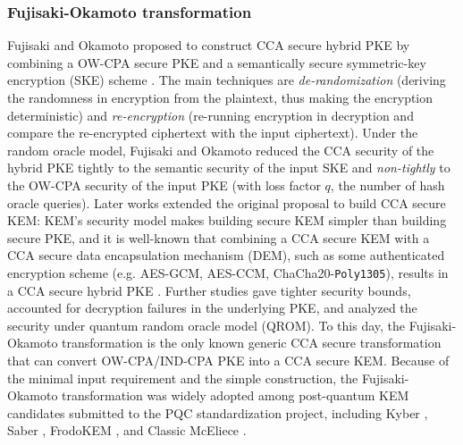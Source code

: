 \documentclass[runningheads]{llncs}
\begin{document}
\subsubsection{Fujisaki-Okamoto transformation}
Fujisaki and Okamoto proposed to construct CCA secure hybrid PKE by combining a OW-CPA secure PKE and a semantically secure symmetric-key encryption (SKE) scheme \cite{DBLP:conf/crypto/FujisakiO99}. The main techniques are \textit{de-randomization} (deriving the randomness in encryption from the plaintext, thus making the encryption deterministic) and \textit{re-encryption} (re-running encryption in decryption and compare the re-encrypted ciphertext with the input ciphertext). Under the random oracle model, Fujisaki and Okamoto reduced the CCA security of the hybrid PKE tightly to the semantic security of the input SKE and \textit{non-tightly} to the OW-CPA security of the input PKE (with loss factor $q$, the number of hash oracle queries). Later works extended the original proposal to build CCA secure KEM: KEM's security model makes building secure KEM simpler than building secure PKE, and it is well-known that combining a CCA secure KEM with a CCA secure data encapsulation mechanism (DEM), such as some authenticated encryption scheme (e.g. AES-GCM, AES-CCM, ChaCha20-\texttt{Poly1305}), results in a CCA secure hybrid PKE \cite{DBLP:journals/iacr/Shoup01,DBLP:conf/eurocrypt/Shoup00a}. Further studies \cite{DBLP:conf/ima/Dent03,DBLP:conf/tcc/HofheinzHK17,DBLP:journals/iacr/BernsteinP18,DBLP:conf/asiacrypt/HovelmannsHM22,DBLP:conf/pqcrypto/XagawaY19,DBLP:conf/crypto/JiangZCWM18} gave tighter security bounds, accounted for decryption failures in the underlying PKE, and analyzed the security under quantum random oracle model (QROM). To this day, the Fujisaki-Okamoto transformation is the only known generic CCA secure transformation that can convert OW-CPA/IND-CPA PKE into a CCA secure KEM. Because of the minimal input requirement and the simple construction, the Fujisaki-Okamoto transformation was widely adopted among post-quantum KEM candidates submitted to the PQC standardization project, including Kyber \cite{DBLP:conf/eurosp/BosDKLLSSSS18}, Saber \cite{DBLP:conf/africacrypt/DAnversKRV18}, FrodoKEM \cite{DBLP:conf/ccs/BosCDMNNRS16}, and Classic McEliece \cite{ClassicMcEliece2022}.
\end{document}
